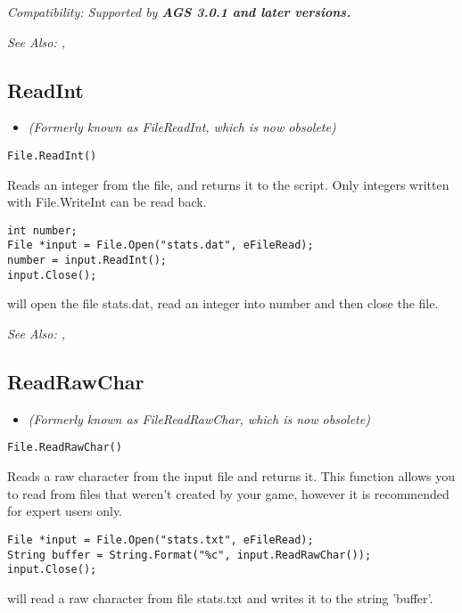 \it{Compatibility:} Supported by \bf{AGS 3.0.1} and later versions.

\it{See Also:} , 


\subsection{ReadInt}\label{File.ReadInt}%

\begin{itemize}
\item \it{(Formerly known as FileReadInt, which is now obsolete)}
\end{itemize}

\begin{verbatim}
File.ReadInt()
\end{verbatim}
Reads an integer from the file, and returns it to the script.
Only integers written with File.WriteInt can be read back.

\begin{verbatim}
int number;
File *input = File.Open("stats.dat", eFileRead);
number = input.ReadInt();
input.Close();
\end{verbatim}
will open the file stats.dat, read an integer into number and then close the file.

\it{See Also:} , 


\subsection{ReadRawChar}\label{File.ReadRawChar}%

\begin{itemize}
\item \it{(Formerly known as FileReadRawChar, which is now obsolete)}
\end{itemize}

\begin{verbatim}
File.ReadRawChar()
\end{verbatim}
Reads a raw character from the input file and returns it. This function
allows you to read from files that weren't created by your game,
however it is recommended for expert users only.

\begin{verbatim}
File *input = File.Open("stats.txt", eFileRead);
String buffer = String.Format("%c", input.ReadRawChar());
input.Close();
\end{verbatim}
will read a raw character from file stats.txt and writes it to the string 'buffer'.


